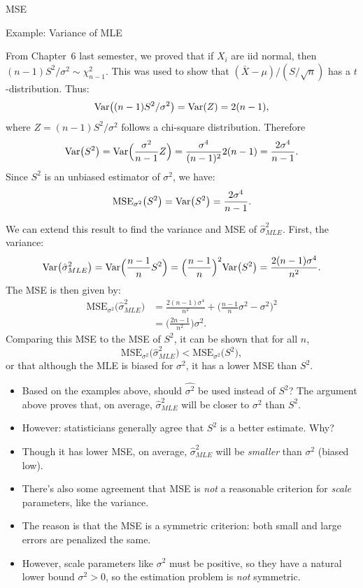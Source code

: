 \begin{frame}[allowframebreaks]{MSE}
\begin{exampleblock}{Example: Variance of MLE}
{    From Chapter~6 last semester, we proved that if $X_i$ are iid normal, then $(n-1)S^2/\sigma^2 \sim \chi^2_{n-1}$. This was used to show that $(\bar{X} - \mu) / (S / \sqrt{n})$ has a $t$-distribution.
    Thus:
    $$
    \mathrm{Var}\big((n-1)S^2/\sigma^2\big) = \mathrm{Var}(Z) = 2(n-1),
    $$
    where $Z = (n-1)S^2/\sigma^2$ follows a chi-square distribution.
    Therefore
    $$
    \mathrm{Var}\big(S^2\big) = \mathrm{Var}\Big(\frac{\sigma^2}{n-1}Z\Big) = \frac{\sigma^4}{(n-1)^2}2(n-1) = \frac{2\sigma^4}{n-1}.
    $$
    Since $S^2$ is an unbiased estimator of $\sigma^2$, we have:
    $$
    \text{MSE}_{\sigma^2}\big(S^2\big) = \mathrm{Var}\big(S^2\big) = \frac{2\sigma^4}{n-1}.
    $$

    We can extend this result to find the variance and MSE of $\hat{\sigma}^2_{MLE}$. First, the variance:
    $$
    \mathrm{Var}\big(\hat{\sigma}^2_{MLE}\big) = \mathrm{Var}\Big(\frac{n-1}{n}S^2\Big) = \Big(\frac{n-1}{n}\Big)^2\mathrm{Var}\big(S^2\big) = \frac{2(n-1)\sigma^4}{n^2}.
    $$
    The MSE is then given by:
    \begin{align*}
      \text{MSE}_{\sigma^2}\big(\hat{\sigma}_{MLE}^2\big) &= \frac{2(n-1)\sigma^4}{n^2} + \Big(\frac{n-1}{n}\sigma^2 - \sigma^2\Big)^2 \\
      &= \Big(\frac{2n-1}{n^2}\Big)\sigma^2.
    \end{align*}
    Comparing this MSE to the MSE of $S^2$, it can be shown that for all $n$,
    $$
    \text{MSE}_{\sigma^2}\big(\hat{\sigma}_{MLE}^2\big) < \text{MSE}_{\sigma^2}\big(S^2\big),
    $$
    or that although the MLE is biased for $\sigma^2$, it has a lower MSE than $S^2$.
    }


  \end{exampleblock}

  \framebreak


  \begin{itemize}
    \item Based on the examples above, should $\hat{\sigma^2}$ be used instead of $S^2$? The argument above proves that, on average, $\hat{\sigma}^2_{MLE}$ will be closer to $\sigma^2$ than $S^2$.
    \item \alert{However}: statisticians generally agree that $S^2$ is a better estimate. Why?
    \item Though it has lower MSE, \alert{on average}, $\hat{\sigma}^2_{MLE}$ will be \emph{smaller} than $\sigma^2$ (biased low).
    \item There's also some agreement that MSE is \emph{not} a reasonable criterion for \emph{scale} parameters, like the variance.
    \item The reason is that the MSE is a symmetric criterion: both small and large errors are penalized the same.
    \item However, scale parameters like $\sigma^2$ must be positive, so they have a natural lower bound $\sigma^2 > 0$, so the estimation problem is \emph{not} symmetric.


\end{itemize}
\end{frame}
